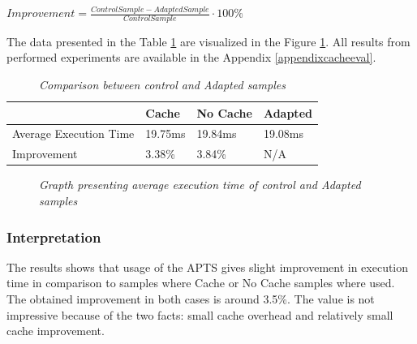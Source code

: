 \documentclass[10pt,a4paper]{article}
\begin{document}
\begin{center}
$Improvement = \frac{ControlSample - AdaptedSample}{ControlSample} \cdot 100\%$
\end{center}

The data presented in the Table \ref{cacheCompResutls} are visualized in the Figure \ref{cacheEvalResutlsGraph}.  All results from performed experiments are available in the Appendix \ref{appendixcacheeval}. 

\begin{table}[!htb]
\caption{\textit{Comparison between control and Adapted samples}} \label{cacheCompResutls}
\begin{tabularx}{\textwidth}{p{4cm}|X|X|X}
 & \textbf{Cache} & \textbf{No Cache} & \textbf{Adapted} \\ \hline
Average Execution Time &  19.75ms & 19.84ms & 19.08ms\\ \hline
Improvement &  3.38\% & 3.84\% & N/A\\ 
\end{tabularx}
\end{table}

\begin{figure}[!htb]
\centering
{}
\caption{\textit{Grapth presenting average execution time of control and Adapted samples}} \label{cacheEvalResutlsGraph}
\end{figure}


\subsubsection{Interpretation} 

The results shows that usage of the APTS gives slight improvement in execution time in comparison to samples where Cache or No Cache samples where used. The obtained improvement in both cases is around 3.5\%. The value is not impressive because of the two facts: small cache overhead and relatively small cache improvement. 
\end{document}
